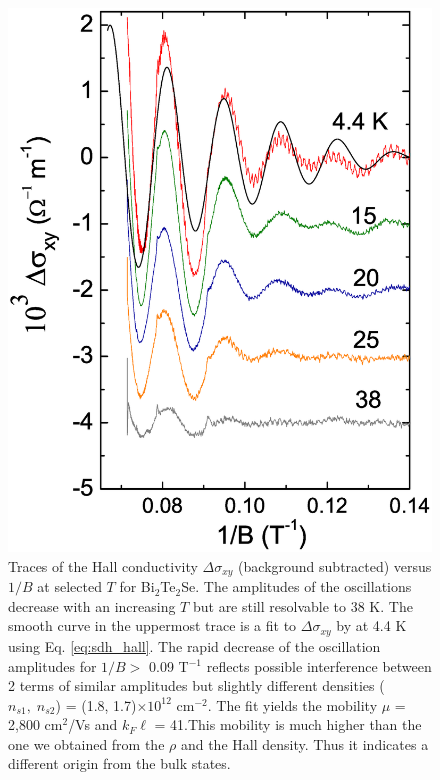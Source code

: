 \begin{figure}[!htbp]
  \begin{center}            
\includegraphics[width=0.9\linewidth]{ch-bts/figures/FigsxyT.eps}
\caption{\label{figsxy} 
Traces of the Hall conductivity $\Delta\sigma_{xy}$ 
(background subtracted) versus $1/B$ at selected $T$ for Bi$_2$Te$_2$Se.
The amplitudes of the oscillations decrease with an increasing $T$ but are still resolvable to 38 K.  
The smooth curve in the uppermost trace is a fit to $\Delta\sigma_{xy}$ by at 4.4 K 
using Eq. \ref{eq:sdh_hall}. The rapid decrease of the oscillation amplitudes for $1/B>$ 0.09 T$^{-1}$
reflects possible interference between 2 terms of similar amplitudes but slightly different
densities ($n_{s1},\;n_{s2}$) = (1.8, 1.7)$\times 10^{12}$ cm$^{-2}$.  
The fit yields the mobility $\mu$ = 2,800 cm$^2$/Vs and $k_F\ell$ = 41.This mobility is much higher than the one we obtained from the $\rho$ and the Hall density. Thus it indicates a different origin from the bulk states.
}
  \end{center}
\end{figure}



